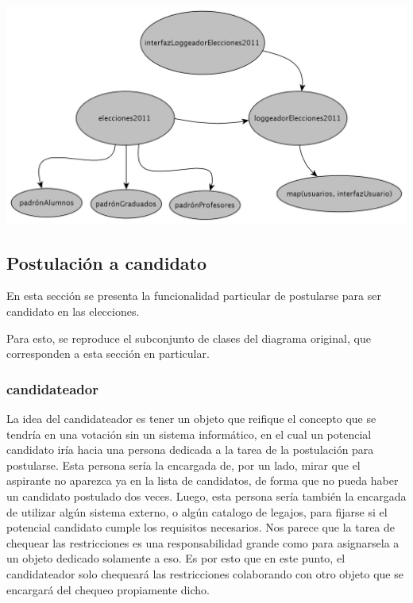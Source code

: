 \begin{center}
\includegraphics[scale=0.3]{diagramas/modeloDeObjetosLogging.png}
\end{center}





\subsection{Postulaci\'on a candidato}

En esta secci\'on se presenta la funcionalidad particular de postularse para ser candidato en las elecciones.


Para esto, se reproduce el subconjunto de clases del diagrama original, que corresponden a esta secci\'on en particular.




\subsubsection{candidateador}

La idea del candidateador es tener un objeto que reifique el concepto que se tendr\'ia en una votaci\'on sin un sistema inform\'atico, en el cual un potencial candidato ir\'ia hacia una persona dedicada a la tarea de la postulaci\'on para postularse. Esta persona ser\'ia la encargada de, por un lado, mirar que el aspirante no aparezca ya en la lista de candidatos, de forma que no pueda haber un candidato postulado dos veces. Luego, esta persona ser\'ia tambi\'en la encargada de utilizar alg\'un sistema externo, o alg\'un catalogo de legajos, para fijarse si el potencial candidato cumple los requisitos necesarios. Nos parece que la tarea de chequear las restricciones es una responsabilidad grande como para asignarsela a un objeto dedicado solamente a eso. Es por esto que en este punto, el candidateador solo chequear\'a las restricciones colaborando con otro objeto que se encargar\'a del chequeo propiamente dicho.


